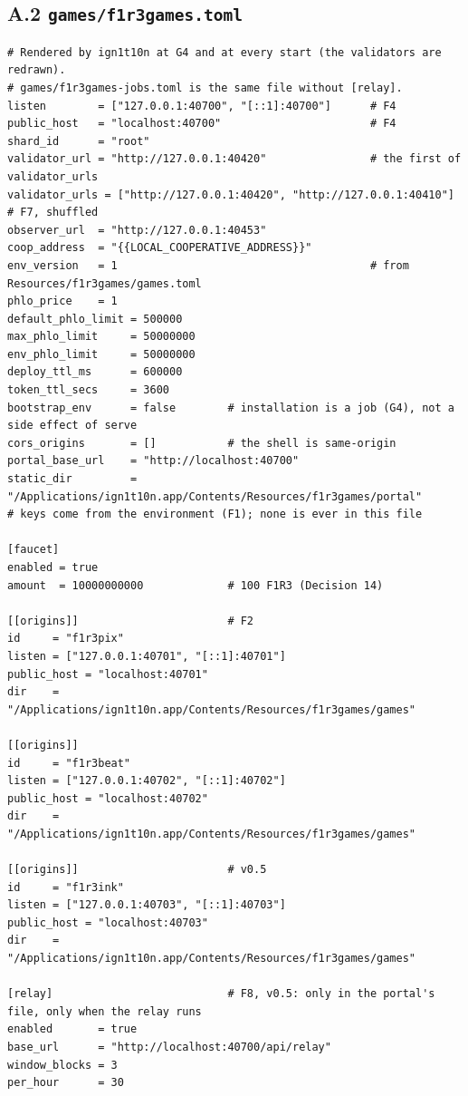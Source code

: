 \documentclass[11pt]{article}
\theoremstyle{definition}
\theoremstyle{remark}
\newcommand{\code}[1]{\texttt{#1}}
\begin{document}
\subsection*{A.2 \code{games/f1r3games.toml}}

\begin{lstlisting}[language=Conf]
# Rendered by ign1t10n at G4 and at every start (the validators are redrawn).
# games/f1r3games-jobs.toml is the same file without [relay].
listen        = ["127.0.0.1:40700", "[::1]:40700"]      # F4
public_host   = "localhost:40700"                       # F4
shard_id      = "root"
validator_url = "http://127.0.0.1:40420"                # the first of validator_urls
validator_urls = ["http://127.0.0.1:40420", "http://127.0.0.1:40410"]   # F7, shuffled
observer_url  = "http://127.0.0.1:40453"
coop_address  = "{{LOCAL_COOPERATIVE_ADDRESS}}"
env_version   = 1                                       # from Resources/f1r3games/games.toml
phlo_price    = 1
default_phlo_limit = 500000
max_phlo_limit     = 50000000
env_phlo_limit     = 50000000
deploy_ttl_ms      = 600000
token_ttl_secs     = 3600
bootstrap_env      = false        # installation is a job (G4), not a side effect of serve
cors_origins       = []           # the shell is same-origin
portal_base_url    = "http://localhost:40700"
static_dir         = "/Applications/ign1t10n.app/Contents/Resources/f1r3games/portal"
# keys come from the environment (F1); none is ever in this file

[faucet]
enabled = true
amount  = 10000000000             # 100 F1R3 (Decision 14)

[[origins]]                       # F2
id     = "f1r3pix"
listen = ["127.0.0.1:40701", "[::1]:40701"]
public_host = "localhost:40701"
dir    = "/Applications/ign1t10n.app/Contents/Resources/f1r3games/games"

[[origins]]
id     = "f1r3beat"
listen = ["127.0.0.1:40702", "[::1]:40702"]
public_host = "localhost:40702"
dir    = "/Applications/ign1t10n.app/Contents/Resources/f1r3games/games"

[[origins]]                       # v0.5
id     = "f1r3ink"
listen = ["127.0.0.1:40703", "[::1]:40703"]
public_host = "localhost:40703"
dir    = "/Applications/ign1t10n.app/Contents/Resources/f1r3games/games"

[relay]                           # F8, v0.5: only in the portal's file, only when the relay runs
enabled       = true
base_url      = "http://localhost:40700/api/relay"
window_blocks = 3
per_hour      = 30
\end{lstlisting}
\end{document}
